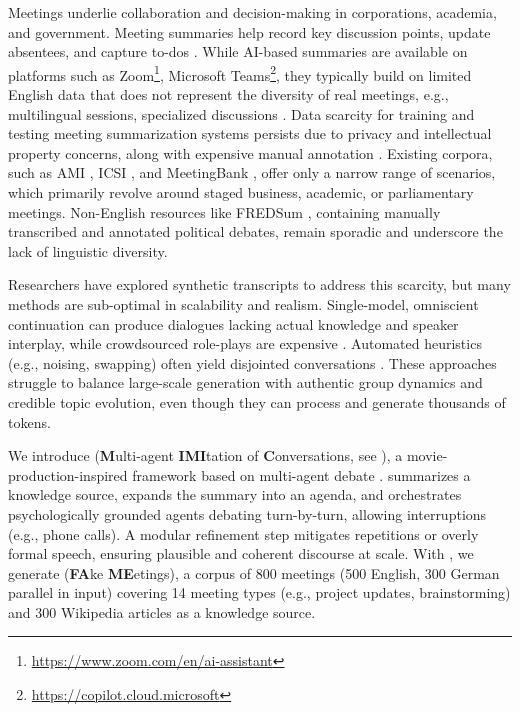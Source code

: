 Meetings underlie collaboration and decision-making in corporations, academia, and government.
Meeting summaries help record key discussion points, update absentees, and capture to-dos \cite{ZhongYYZ21h, HuGDD23a, LaskarFCB23}.
While AI-based summaries are available on platforms such as Zoom\footnote{\href{https://www.zoom.com/en/ai-assistant}{https://www.zoom.com/en/ai-assistant}}, Microsoft Teams\footnote{\href{https://copilot.cloud.microsoft}{https://copilot.cloud.microsoft}}, they typically build on limited English data that does not represent the diversity of real meetings, e.g., multilingual sessions, specialized discussions \cite{KirsteinWGR25}.
Data scarcity for training and testing meeting summarization systems persists due to privacy and intellectual property concerns, along with expensive manual annotation \cite{AbachaYFL23}.
Existing corpora, such as AMI \cite{MccowanCKA05}, ICSI \cite{JaninBEE03}, and MeetingBank \cite{HuGDD23a}, offer only a narrow range of scenarios, which primarily revolve around staged business, academic, or parliamentary meetings.
Non-English resources like FREDSum \cite{RennardSGH23a}, containing manually transcribed and annotated political debates, remain sporadic and underscore the lack of linguistic diversity.

Researchers have explored synthetic transcripts to address this scarcity, but many methods are sub-optimal in scalability and realism.
Single-model, omniscient continuation \cite{QiuP24, ZhouSEK24} can produce dialogues lacking actual knowledge and speaker interplay, while crowdsourced role-plays are expensive \cite{MccowanCKA05,ThulkeGJD24}. 
Automated heuristics (e.g., noising, swapping) often yield disjointed conversations \cite{ChenY21, ParkSL22, LiuMSN22}. 
These approaches struggle to balance large-scale generation with authentic group dynamics and credible topic evolution, even though they can process and generate thousands of tokens.




We introduce \textbf{\pipeline{}} (\textbf{M}ulti-agent \textbf{IMI}tation of \textbf{C}onversations, see ), a movie-production-inspired framework based on multi-agent debate \cite{LiangHJW24a,DuLTT24}.
\pipeline{} summarizes a knowledge source, expands the summary into an agenda, and orchestrates psychologically grounded agents debating turn-by-turn, allowing interruptions (e.g., phone calls).
A modular refinement step mitigates repetitions or overly formal speech, ensuring plausible and coherent discourse at scale.
With \pipeline{}, we generate \textbf{\dataset{}} (\textbf{FA}ke \textbf{ME}etings), a corpus of 800 meetings (500 English, 300 German parallel in input) covering 14 meeting types (e.g., project updates, brainstorming) and 300 Wikipedia articles as a knowledge source.



